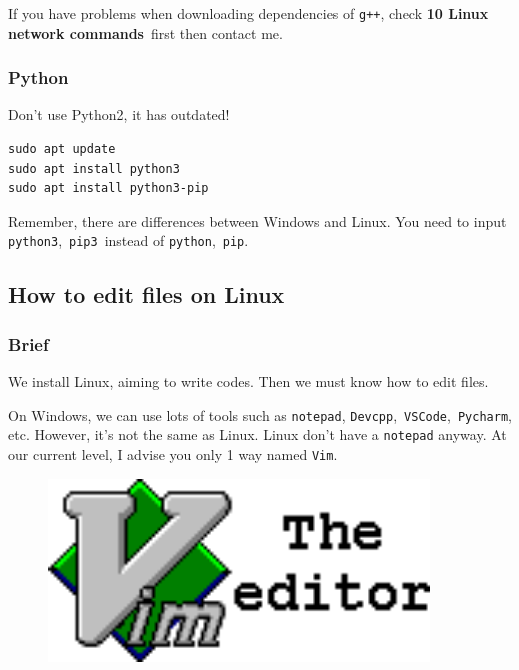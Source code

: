 \documentclass[12pt]{ctexart}
\newenvironment{mdquote}
{%
  \par\noindent
  \begin{list}{}{%
      \setlength{\leftmargin}{1em}%
      \setlength{\rightmargin}{0pt}%
      \setlength{\itemindent}{0pt}%
      \setlength{\listparindent}{\parindent}%
      \setlength{\topsep}{0.5\baselineskip}%
  }
  \item[\textbf{>}\ ]\itshape
}
{\end{list}\par}
\begin{document}
\begin{mdquote}
If you have problems when downloading dependencies of \texttt{g++}, check
\textbf{10 Linux network commands}\ first then contact me.
\end{mdquote}

\subsubsection{\textbf{Python}}

\begin{mdquote}
Don't use Python2, it has outdated!
\end{mdquote}

\begin{adjustwidth}{2em}{0pt}
\begin{verbatim}
sudo apt update
sudo apt install python3
sudo apt install python3-pip
\end{verbatim}
\end{adjustwidth}

Remember, there are differences between Windows and Linux. You need to
input \texttt{python3},\ \texttt{pip3}\ instead of \texttt{python},\
\texttt{pip}.

\subsection{\textbf{How to edit files on Linux}}

\subsubsection{\textbf{Brief}}

We install Linux, aiming to write codes. Then we must know how to edit
files.

On Windows, we can use lots of tools such as \texttt{notepad},
\texttt{Devcpp},\ \texttt{VSCode},\ \texttt{Pycharm}, etc. However,
it's not the same as Linux. Linux don't
have a \texttt{notepad} anyway. At our current level, I advise you only
1 way named \texttt{Vim}.

\begin{figure}[H]
    \centering
    \includegraphics[width=0.9\textwidth,keepaspectratio]{assets/Linux/1.3 How to edit files on Linux/1.png}
\end{figure}
\end{document}
